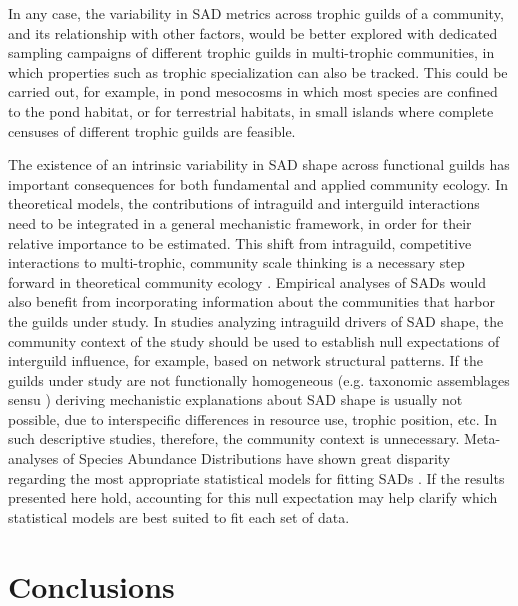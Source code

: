 In any case, the variability in SAD metrics across trophic guilds of a community, and its relationship with other factors, would be better explored with dedicated sampling campaigns of different trophic guilds in multi-trophic communities, in which properties such as trophic specialization can also be tracked. This could be carried out, for example, in pond mesocosms in which most species are confined to the pond habitat, or for terrestrial habitats, in small islands where complete censuses of different trophic guilds are feasible.

The existence of an intrinsic variability in SAD shape across functional guilds has important consequences for both fundamental and applied community ecology. In theoretical models, the contributions of intraguild and interguild interactions need to be integrated in a general mechanistic framework, in order for their relative importance to be estimated. This shift from intraguild, competitive interactions to multi-trophic, community scale thinking is a necessary step forward in theoretical community ecology \citep{Chesson2008,Godoy2018,Seibold2018}. Empirical analyses of SADs would also benefit from incorporating information about the communities that harbor the guilds under study. In studies analyzing intraguild drivers of SAD shape, the community context of the study should be used to establish null expectations of interguild influence, for example, based on network structural patterns. If the guilds under study are not functionally homogeneous (e.g. taxonomic assemblages sensu \citealt{Fauth1996}) deriving mechanistic explanations about SAD shape is usually not possible, due to interspecific differences in resource use, trophic position, etc. In such descriptive studies, therefore, the community context is unnecessary. Meta-analyses of Species Abundance Distributions have shown great disparity regarding the most appropriate statistical models for fitting SADs \citep{Ulrich2010,Baldridge2016}. If the results presented here hold, accounting for this null expectation may help clarify which statistical models are best suited to fit each set of data.

\section{Conclusions}

